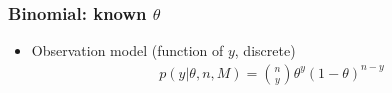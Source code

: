 \documentclass[english,t]{beamer}
\begin{document}
\begin{frame}
  \frametitle{Binomial: known $\theta$}

  \begin{itemize}
  \item Observation model (function of $y$, discrete)
    \begin{align*}
      p(y|\theta,n,M) = \binom{n}{y} \theta^y(1-\theta)^{n-y}
    \end{align*}
  \end{itemize}

  \begin{center}
\end{center}
\end{frame}
\end{document}
